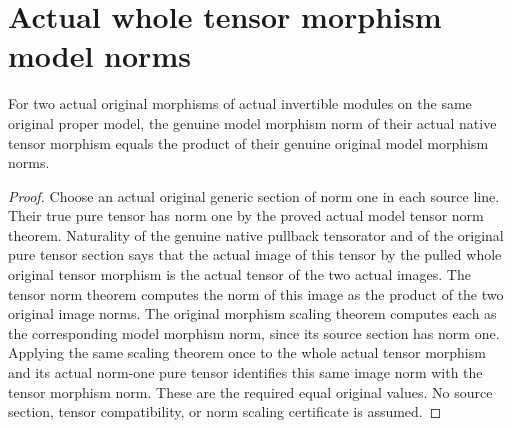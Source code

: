 \section{Actual whole tensor morphism model norms}

\begin{lemma}
\label{lem:actual-model-tensor-hom-norm}
\leanok
{}
For two actual original morphisms of actual invertible modules on
the same original proper model, the genuine model morphism norm
of their actual native tensor morphism equals the product of
their genuine original model morphism norms.
\end{lemma}
\begin{proof}
Choose an actual original generic section of norm one in each
source line. Their true pure tensor has norm one by the proved
actual model tensor norm theorem. Naturality of the genuine native
pullback tensorator and of the original pure tensor section says
that the actual image of this tensor by the pulled whole original
tensor morphism is the actual tensor of the two actual images.
The tensor norm theorem computes the norm of this image as the
product of the two original image norms. The original morphism
scaling theorem computes each as the corresponding model morphism
norm, since its source section has norm one. Applying the same
scaling theorem once to the whole actual tensor morphism and its
actual norm-one pure tensor identifies this same image norm with
the tensor morphism norm. These are the required equal original
values. No source section, tensor compatibility, or norm scaling
certificate is assumed.
\end{proof}
